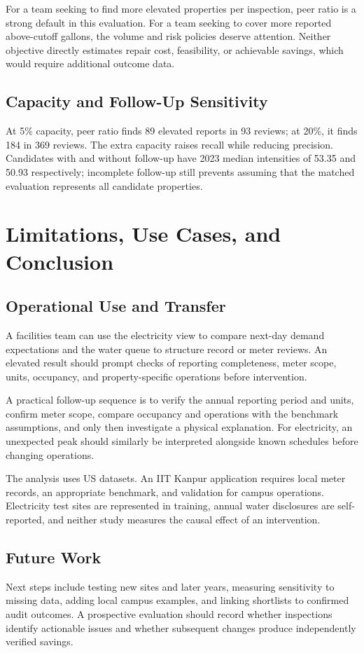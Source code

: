 \documentclass[12pt,a4paper]{article}
\begin{document}
For a team seeking to find more elevated properties per inspection, peer ratio is a strong default in this evaluation. For a team seeking to cover more reported above-cutoff gallons, the volume and risk policies deserve attention. Neither objective directly estimates repair cost, feasibility, or achievable savings, which would require additional outcome data.

\subsection{Capacity and Follow-Up Sensitivity}
At 5\% capacity, peer ratio finds 89 elevated reports in 93 reviews; at 20\%, it finds 184 in 369 reviews. The extra capacity raises recall while reducing precision. Candidates with and without follow-up have 2023 median intensities of 53.35 and 50.93 respectively; incomplete follow-up still prevents assuming that the matched evaluation represents all candidate properties.

\newpage
\section{Limitations, Use Cases, and Conclusion}
\subsection{Operational Use and Transfer}
A facilities team can use the electricity view to compare next-day demand expectations and the water queue to structure record or meter reviews. An elevated result should prompt checks of reporting completeness, meter scope, units, occupancy, and property-specific operations before intervention.

A practical follow-up sequence is to verify the annual reporting period and units, confirm meter scope, compare occupancy and operations with the benchmark assumptions, and only then investigate a physical explanation. For electricity, an unexpected peak should similarly be interpreted alongside known schedules before changing operations.

The analysis uses US datasets. An IIT Kanpur application requires local meter records, an appropriate benchmark, and validation for campus operations. Electricity test sites are represented in training, annual water disclosures are self-reported, and neither study measures the causal effect of an intervention.

\subsection{Future Work}
Next steps include testing new sites and later years, measuring sensitivity to missing data, adding local campus examples, and linking shortlists to confirmed audit outcomes. A prospective evaluation should record whether inspections identify actionable issues and whether subsequent changes produce independently verified savings.
\end{document}
